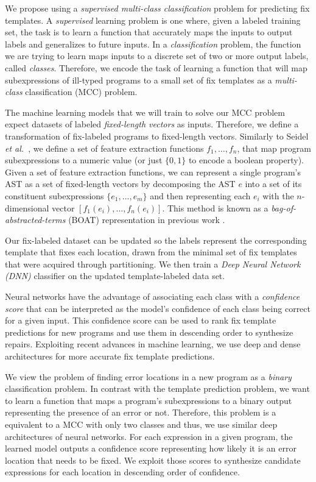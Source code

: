 We propose using a \emph{supervised multi-class classification} problem for
predicting fix templates. A \emph{supervised} learning problem is one where,
given a labeled training set, the task is to learn a function that accurately
maps the inputs to output labels and generalizes to future inputs. In a
\emph{classification} problem, the function we are trying to learn maps inputs
to a discrete set of two or more output labels, called \emph{classes}.
Therefore, we encode the task of learning a function that will map
subexpressions of ill-typed programs to a small set of fix templates as a
\emph{multi-class} classification (MCC) problem.

 The machine learning models that we will train to
solve our MCC problem expect datasets of labeled \emph{fixed-length vectors} as
inputs. Therefore, we define a transformation of fix-labeled programs to
fixed-length vectors. Similarly to Seidel \emph{et al.}~\citep{Seidel:2017}, we
define a set of feature extraction functions $f_1, \ldots, f_n$, that map
program subexpressions to a numeric value (or just $\{0, 1\}$ to encode a
boolean property). Given a set of feature extraction functions, we can represent
a single program's AST as a set of fixed-length vectors by decomposing the AST
$e$ into a set of its constituent subexpressions $\{e_1, \ldots, e_m\}$ and then
representing each $e_i$ with the $n$-dimensional vector $[f_1(e_i), \ldots,
f_n(e_i)]$. This method is known as a \emph{bag-of-abstracted-terms} (BOAT)
representation in previous work \citep{Seidel:2017}.

Our fix-labeled dataset can be updated so the labels represent the corresponding
template that fixes each location, drawn from the minimal set of fix templates
that were acquired through partitioning. We then train a \emph{Deep Neural
Network (DNN)} classifier on the updated template-labeled data set.

Neural networks have the advantage of associating each class with a
\emph{confidence score} that can be interpreted as the model's confidence of
each class being correct for a given input. This confidence score can be used to
rank fix template predictions for new programs and use them in descending order
to synthesize repairs. Exploiting recent advances in machine learning, we use
deep and dense architectures \citep{Schmidhuber_2015} for more accurate fix
template predictions.

 We view the problem of finding error locations
in a new program as a \emph{binary} classification problem. In contrast with the
template prediction problem, we want to learn a function that maps a program's
subexpressions to a binary output representing the presence of an error or not.
Therefore, this problem is a equivalent to a MCC with only two classes and thus,
we use similar deep architectures of neural networks. For each expression in a
given program, the learned model outputs a confidence score representing how
likely it is an error location that needs to be fixed. We exploit those scores
to synthesize candidate expressions for each location in descending order of
confidence.

